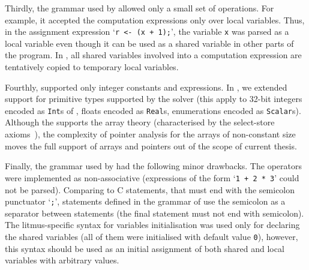 Thirdly, the grammar used by \porthos{} allowed only a small set of operations.
For example, it accepted the computation expressions only over local variables.
Thus, in the assignment expression `\lstinline{r <- (x + 1);}', the variable \lstinline{x} was parsed as a local variable even though it can be used as a shared variable in other parts of the program.
In \porthos[2], all shared variables involved into a computation expression are tentatively copied to temporary local variables.

Fourthly, \porthos[1] supported only integer constants and expressions.
In \porthos[2], we extended support for primitive types supported by the  solver (this apply to 32-bit integers encoded as \texttt{Int}s of , floats encoded as \texttt{Real}s, enumerations encoded as \texttt{Scalar}s).
Although the  supports the array theory (characterised by the select-store axioms~\cite{de2011z3}), the complexity of pointer analysis for the arrays of non-constant size moves the full support of arrays and pointers out of the scope of current thesis.

Finally, the grammar used by \porthos{} had the following minor drawbacks. %
The operators were implemented as non-associative (expressions of the form `\lstinline{1 + 2 * 3}' could not be parsed).
Comparing to C statements, that must end with the semicolon punctuator `\lstinline{;}', statements defined in the grammar of \porthos[1] use the semicolon as a separator between statements (the final statement must not end with semicolon).
The litmus-specific syntax for variables initialisation was used only for declaring the shared variables (all of them were initialised with default value \lstinline{0}), however, this syntax should be used as an initial assignment of both shared and local variables with arbitrary values.

